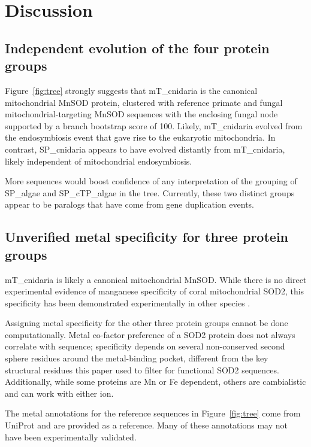 
\section*{Discussion}


\subsection*{Independent evolution of the four protein groups}

Figure~\ref{fig:tree} strongly suggests that mT\_cnidaria is the canonical
mitochondrial MnSOD protein, clustered with reference primate and fungal
mitochondrial-targeting MnSOD sequences with the enclosing fungal node
supported by a branch bootstrap score of 100. Likely, mT\_cnidaria evolved from
the endosymbiosis event that gave rise to the eukaryotic mitochondria. In
contrast, SP\_cnidaria appears to have evolved distantly from mT\_cnidaria,
likely independent of mitochondrial endosymbiosis.

More sequences would boost confidence of any interpretation of the grouping of
SP\_algae and SP\_cTP\_algae in the tree. Currently, these two distinct groups
appear to be paralogs that have come from gene duplication events.


\subsection*{Unverified metal specificity for three protein groups}

mT\_cnidaria is likely a canonical mitochondrial MnSOD. While there is no
direct experimental evidence of manganese specificity of coral mitochondrial
SOD2, this specificity has been demonstrated experimentally in other species
\cite{luk2005jbc}.

Assigning metal specificity for the other three protein groups cannot be done
computationally. Metal co-factor preference of a SOD2 protein does not always
correlate with sequence; specificity depends on several non-conserved second
sphere residues around the metal-binding pocket, different from the key
structural residues this paper used to filter for functional SOD2 sequences.
Additionally, while some proteins are Mn or Fe dependent, others are
cambialistic and can work with either ion.

The metal annotations for the reference sequences in Figure~\ref{fig:tree} come
from UniProt and are provided as a reference. Many of these annotations may not
have been experimentally validated.


